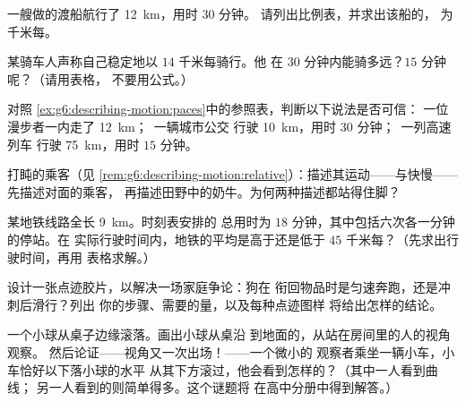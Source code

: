 \begin{exercise}[$\star$]\label{exo:g6:describing-motion:6}
一艘做的渡船航行了 \qty{12}{km}，用时 $30$ 分钟。
请列出比例表，并求出该船的，
为千米每。
\end{exercise}

\begin{exercise}[$\star$]\label{exo:g6:describing-motion:7}
某骑车人声称自己稳定地以 $14$ 千米每骑行。他
在 $30$ 分钟内能骑多远？$15$ 分钟呢？（请用表格，
不要用公式。）
\end{exercise}

\begin{exercise}[$\star$]\label{exo:g6:describing-motion:8}
对照
\cref{ex:g6:describing-motion:paces}中的参照表，判断以下说法是否可信：
一位漫步者一内走了 \qty{12}{km}；\ 一辆城市公交
行驶 \qty{10}{km}，用时 $30$ 分钟；\ 一列高速列车
行驶 \qty{75}{km}，用时 $15$ 分钟。
\end{exercise}

\begin{exercise}[$\star\star$]\label{exo:g6:describing-motion:9}
打盹的乘客（见
\cref{rem:g6:describing-motion:relative}）：描述其运动——与快慢——
先描述对面的乘客，
再描述田野中的奶牛。为何两种描述都站得住脚？
\end{exercise}

\begin{exercise}[$\star\star$]\label{exo:g6:describing-motion:10}
某地铁线路全长 \qty{9}{km}。时刻表安排的
总用时为 $18$ 分钟，其中包括六次各一分钟的停站。在
实际行驶时间内，地铁的平均是高于还是低于
$45$ 千米每？（先求出行驶时间，再用
表格求解。）
\end{exercise}

\begin{exercise}[$\star\star$]\label{exo:g6:describing-motion:11}
设计一张点迹胶片，以解决一场家庭争论：狗在
衔回物品时是匀速奔跑，还是冲刺后滑行？列出
你的步骤、需要的量，以及每种点迹图样
将给出怎样的结论。
\end{exercise}

\begin{exercise}[$\star\star\star$]\label{exo:g6:describing-motion:12}
一个小球从桌子边缘滚落。画出小球从桌沿
到地面的，从站在房间里的人的视角观察。
然后论证——视角又一次出场！——一个微小的
观察者乘坐一辆小车，小车恰好以下落小球的水平
从其下方滚过，他会看到怎样的？（其中一人看到曲线；
另一人看到的则简单得多。这个谜题将
在高中分册中得到解答。）
\end{exercise}

